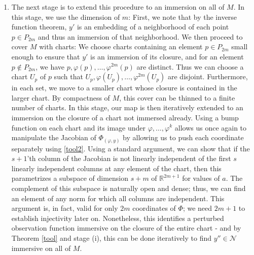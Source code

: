 \documentclass[11pt, a4paper]{memoir}
\theoremstyle{break}
\theoremstyle{break}
\theoremstyle{nonumberplain}
\newcommand{\mR}{\mathbb{R}}
\begin{document}
\begin{enumerate}[label=(\roman*)]
	\item The next stage is to extend this procedure to an immersion on all of $M$. In this stage, we use the dimension of $m$: First, we note that by the inverse function theorem, $y'$ is an embedding of a neighborhood of each point $p\in P_{2m}$ and thus an immersion of that neighborhood. We then proceed to cover $M$ with charts:  We choose charts containing an element $p\in P_{2m}$ small enough to ensure that $y'$ is an immersion of its closure, and for an element $p\notin P_{2m}$, we have $p,\varphi(p),\ldots, \varphi^{2m}(p)$ are distinct. Thus we can choose a chart $U_p$ of $p$ such that $U_p,\varphi(U_p),\ldots, \varphi^{2m}(U_p)$ are disjoint. Furthermore, in each set, we move to a smaller chart whose closure is contained in the larger chart. By compactness of $M$, this cover can be thinned to a finite number of charts. In this stage, our map is then iteratively extended to an immersion on the closure of a chart not immersed already. Using a bump function on each chart and its image under $\varphi,\ldots,\varphi^k$ allows us once again to manipulate the Jacobian of $\Phi_{(\varphi,y)}$ by allowing us to push each coordinate separately using \ref{tool2}. Using a standard argument, we can show that if the $s+1$'th column of the Jacobian is not linearly independent of the first $s$ linearly independent columns at any element of the chart, then this parametrizes a subspace of dimension $s+m$ of $\mR^{2m+1}$ for values of $a$. The complement of this subspace is naturally open and dense; thus, we can find an element of any norm for which all columns are independent. This argument is, in fact, valid for only $2m$ coordinates of $\Phi$; we need $2m+1$ to establish injectivity later on. Nonetheless, this identifies a perturbed observation function immersive on the closure of the entire chart - and by Theorem \ref{tool} and stage (i), this can be done iteratively to find $y''\in \mathcal{N}$ immersive on all of $M$.

\end{enumerate}
\end{document}
